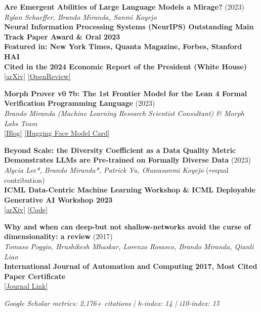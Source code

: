 \documentclass{article}
\newenvironment{changemargin}[2]{%
  \begin{list}{}{%
    \setlength{\topsep}{0pt}%
    \setlength{\leftmargin}{#1}%
    \setlength{\rightmargin}{#2}%
    \setlength{\listparindent}{\parindent}%
    \setlength{\itemindent}{\parindent}%
    \setlength{\parsep}{\parskip}%
  }%
  \item[]}{\end{list}
}
\newenvironment{body} {
	\vspace*{-16pt}
	\begin{changemargin}{-0.25in}{-0.5in}
  }	
	{\end{changemargin}
}
\begin{document}
\begin{body}
    \vspace{10pt}
    \textbf{Are Emergent Abilities of Large Language Models a Mirage?} (2023)\\
    \emph{Rylan Schaeffer, Brando Miranda, Sanmi Koyejo}\\
    \textbf{Neural Information Processing Systems (NeurIPS) Outstanding Main Track Paper Award \& Oral 2023}\\
    \textbf{Featured in: New York Times, Quanta Magazine, Forbes, Stanford HAI}\\
    \textbf{Cited in the 2024 Economic Report of the President (White House)}\\
    \href{https://arxiv.org/abs/2304.15004}{[arXiv]} \href{https://openreview.net/forum?id=ITw9edRDlD}{[OpenReview]}
    
    \vspace{10pt}
    \textbf{Morph Prover v0 7b: The 1st Frontier Model for the Lean 4 Formal Verification Programming Language} (2023)\\
    \emph{Brando Miranda (Machine Learning Research Scientist Consultant) \& Morph Labs Team}\\
    \href{https://morph.so/blog/the-personal-ai-proof-engineer/}{[Blog]} \href{https://huggingface.co/morph-labs/morph-prover-v0-7b}{[Hugging Face Model Card]}
    
    \vspace{10pt}
    \textbf{Beyond Scale: the Diversity Coefficient as a Data Quality Metric Demonstrates LLMs are Pre-trained on Formally Diverse Data} (2023)\\
    \emph{Alycia Lee*, Brando Miranda*, Patrick Yu, Oluwasanmi Koyejo} (∗equal contribution)\\
    \textbf{ICML Data-Centric Machine Learning Workshop \& ICML Deployable Generative AI Workshop 2023}\\
    \href{https://arxiv.org/abs/2306.13840}{[arXiv]} \href{https://github.com/alycialee/beyond-scale-language-data-diversity}{[Code]}
    
    \vspace{10pt}
    \textbf{Why and when can deep-but not shallow-networks avoid the curse of dimensionality: a review} (2017)\\
    \emph{Tomaso Poggio, Hrushikesh Mhaskar, Lorenzo Rosasco, Brando Miranda, Qianli Liao}\\
    \textbf{International Journal of Automation and Computing 2017, Most Cited Paper Certificate}\\
    \href{https://link.springer.com/article/10.1007/s11633-017-1054-2}{[Journal Link]}
    
    \vspace{8pt}
    \emph{Google Scholar metrics: 2,176+ citations | h-index: 14 | i10-index: 15}
\end{body}
\end{document}
